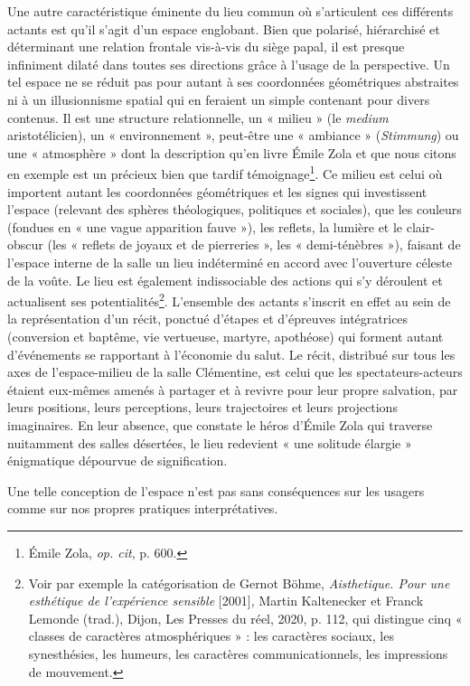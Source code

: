 \documentclass[12pt,twoside,openany]{book}
\begin{document}
Une autre caractéristique éminente du lieu commun où s’articulent ces différents actants est qu’il s’agit d’un espace englobant. Bien que polarisé, hiérarchisé et déterminant une relation frontale vis-à-vis du siège papal, il est presque infiniment dilaté dans toutes ses directions grâce à l’usage de la perspective. Un tel espace ne se réduit pas pour autant à ses coordonnées géométriques abstraites ni à un illusionnisme spatial qui en feraient un simple contenant pour divers contenus. Il est une structure relationnelle, un « milieu » (le \textit{medium }aristotélicien), un « environnement », peut-être une « ambiance » (\textit{Stimmung}) ou une « atmosphère » dont la description qu’en livre Émile Zola et que nous citons en exemple est un précieux bien que tardif témoignage\footnote{Émile Zola, \textit{op. cit}, p. 600.}. Ce milieu est celui où importent autant les coordonnées géométriques et les signes qui investissent l’espace (relevant des sphères théologiques, politiques et sociales), que les couleurs (fondues en « une vague apparition fauve »), les reflets, la lumière et le clair-obscur (les « reflets de joyaux et de pierreries », les « demi-ténèbres »), faisant de l’espace interne de la salle un lieu indéterminé en accord avec l’ouverture céleste de la voûte. Le lieu est également indissociable des actions qui s’y déroulent et actualisent ses potentialités\footnote{Voir par exemple la catégorisation de Gernot Böhme, \textit{Aisthetique. Pour une esthétique de l’expérience sensible }[2001]\textit{, }Martin Kaltenecker et Franck Lemonde (trad.), Dijon, Les Presses du réel, 2020, p. 112, qui distingue cinq « classes de caractères atmosphériques » : les caractères sociaux, les synesthésies, les humeurs, les caractères communicationnels, les impressions de mouvement.}. L’ensemble des actants s’inscrit en effet au sein de la représentation d’un récit, ponctué d’étapes et d’épreuves intégratrices (conversion et baptême, vie vertueuse, martyre, apothéose) qui forment autant d’événements se rapportant à l’économie du salut. Le récit, distribué sur tous les axes de l’espace-milieu de la salle Clémentine, est celui que les spectateurs-acteurs étaient eux-mêmes amenés à partager et à revivre pour leur propre salvation, par leurs positions, leurs perceptions, leurs trajectoires et leurs projections imaginaires. En leur absence, que constate le héros d’Émile Zola qui traverse nuitamment des salles désertées, le lieu redevient « une solitude élargie » énigmatique dépourvue de signification.

Une telle conception de l’espace n’est pas sans conséquences sur les usagers comme sur nos propres pratiques interprétatives.
\end{document}
